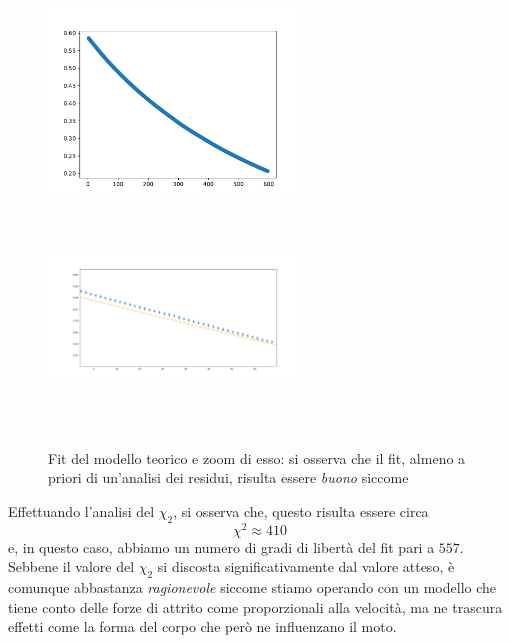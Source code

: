 \documentclass{article}
\begin{document}
\begin{figure}[htbp]
	\centering
	\includegraphics[scale=0.80, width=0.6\textwidth]{Fit_velocita.pdf}
	\includegraphics[scale=0.50, width=0.6\textwidth, height=6cm]{pendolo_quadrifilare_zoom.png}
	\caption{Fit del modello teorico e zoom di esso: si osserva che il fit, almeno a priori di un'analisi dei residui, risulta essere \emph{buono} siccome}
\end{figure}
Effettuando l'analisi del $\chi_2$, si osserva che, questo risulta essere circa
$$
	\chi^2 \approx 410
$$
e, in questo caso, abbiamo un numero di gradi di libertà del fit pari a $557$. Sebbene il valore del $\chi_2$ si discosta significativamente dal valore atteso, è comunque abbastanza \emph{ragionevole} siccome stiamo operando con un modello che tiene conto delle forze di attrito come proporzionali alla velocità, ma ne trascura effetti come la forma del corpo che però ne influenzano il moto. \\
\end{document}
